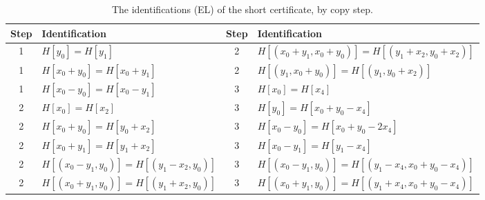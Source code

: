 \documentclass[11pt]{amsart}
\theoremstyle{definition}
\theoremstyle{remark}
\numberwithin{equation}{section}
\begin{document}
\begin{table}[ht]
\centering
\caption{The identifications (EL) of the short certificate, by copy step.}\label{tab:shortel}
\small
\begin{tabular}{@{}cl@{\qquad}cl@{}}
\toprule
Step & Identification & Step & Identification\\
\midrule
1 & $H[y_0]=H[y_1]$ & 2 & $H[(x_0+y_1, x_0+y_0)]=H[(y_1+x_2, y_0+x_2)]$\\
1 & $H[x_0+y_0]=H[x_0+y_1]$ & 2 & $H[(y_1, x_0+y_0)]=H[(y_1, y_0+x_2)]$\\
1 & $H[x_0-y_0]=H[x_0-y_1]$ & 3 & $H[x_0]=H[x_4]$\\
2 & $H[x_0]=H[x_2]$ & 3 & $H[y_0]=H[x_0+y_0-x_4]$\\
2 & $H[x_0+y_0]=H[y_0+x_2]$ & 3 & $H[x_0-y_0]=H[x_0+y_0-2x_4]$\\
2 & $H[x_0+y_1]=H[y_1+x_2]$ & 3 & $H[x_0-y_1]=H[y_1-x_4]$\\
2 & $H[(x_0-y_1, y_0)]=H[(y_1-x_2, y_0)]$ & 3 & $H[(x_0-y_1, y_0)]=H[(y_1-x_4, x_0+y_0-x_4)]$\\
2 & $H[(x_0+y_1, y_0)]=H[(y_1+x_2, y_0)]$ & 3 & $H[(x_0+y_1, y_0)]=H[(y_1+x_4, x_0+y_0-x_4)]$\\
\bottomrule
\end{tabular}
\end{table}
\end{document}
